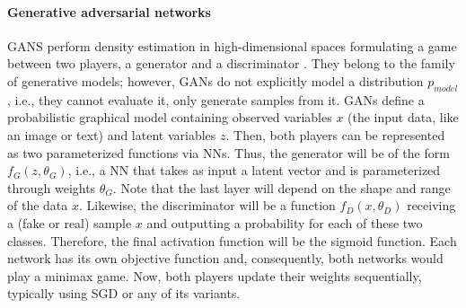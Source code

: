 \paragraph{Generative adversarial networks} GANS  perform density estimation in high-dimensional spaces formulating a game between two players, a generator and a discriminator \parencite{goodfellow2014generative}. They belong to the family of generative models; however, GANs do not explicitly model a distribution $p_{model}$, i.e., they cannot evaluate it, only generate samples from it.
GANs define a probabilistic graphical model containing observed variables $x$ (the input data, like an image or text) and latent variables $z$. Then, both players can be represented as two parameterized functions via NNs. Thus, the generator will be of the form $f_G(z, \theta_G)$, i.e., a NN that takes as input a latent vector and is parameterized through weights $\theta_G$. Note that the last layer will depend on the shape and range of the data $x$. Likewise, the discriminator will be a function $f_D(x, \theta_D)$ receiving a (fake or real) sample $x$ and outputting a probability for each of these two classes. Therefore, the final activation function will be 
the sigmoid function. Each network has its own objective function
and, consequently, both networks would play a minimax game.
Now, both players update their weights sequentially, typically using SGD or any of its variants.




